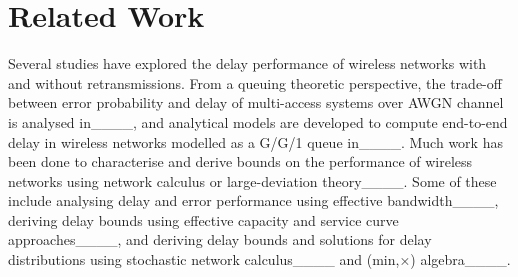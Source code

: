 \section{Related Work}
Several studies have explored the delay performance of wireless networks with and without retransmissions.
From a queuing theoretic perspective, the trade-off between error probability and delay of multi-access systems over AWGN channel is analysed in____, and analytical models are developed to compute end-to-end delay in wireless networks modelled as a G/G/1 queue in____.
Much work has been done to characterise and derive bounds on the performance of wireless networks using network calculus or large-deviation theory____.
Some of these include analysing delay and error performance using effective bandwidth____, 
deriving delay bounds using effective capacity and service curve approaches____,
and deriving delay bounds and solutions for delay distributions using stochastic network calculus____ and (min,×) algebra____.



